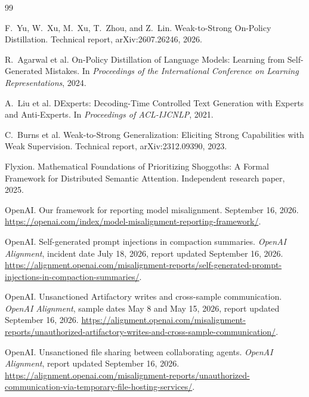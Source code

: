 \documentclass[11pt]{article}
\begin{document}
\begin{thebibliography}{99}

F.~Yu, W.~Xu, M.~Xu, T.~Zhou, and Z.~Lin.
\newblock Weak-to-Strong On-Policy Distillation.
\newblock Technical report, arXiv:2607.26246, 2026.

R.~Agarwal et al.
\newblock On-Policy Distillation of Language Models: Learning from Self-Generated Mistakes.
\newblock In \emph{Proceedings of the International Conference on Learning Representations}, 2024.

A.~Liu et al.
\newblock DExperts: Decoding-Time Controlled Text Generation with Experts and Anti-Experts.
\newblock In \emph{Proceedings of ACL-IJCNLP}, 2021.

C.~Burns et al.
\newblock Weak-to-Strong Generalization: Eliciting Strong Capabilities with Weak Supervision.
\newblock Technical report, arXiv:2312.09390, 2023.

Flyxion.
\newblock Mathematical Foundations of Prioritizing Shoggoths: A Formal Framework for Distributed Semantic Attention.
\newblock Independent research paper, 2025.

OpenAI.
\newblock Our framework for reporting model misalignment.
\newblock September 16, 2026.
\newblock \url{https://openai.com/index/model-misalignment-reporting-framework/}.

OpenAI.
\newblock Self-generated prompt injections in compaction summaries.
\newblock \emph{OpenAI Alignment}, incident date July 18, 2026, report updated September 16, 2026.
\newblock \url{https://alignment.openai.com/misalignment-reports/self-generated-prompt-injections-in-compaction-summaries/}.

OpenAI.
\newblock Unsanctioned Artifactory writes and cross-sample communication.
\newblock \emph{OpenAI Alignment}, sample dates May 8 and May 15, 2026, report updated September 16, 2026.
\newblock \url{https://alignment.openai.com/misalignment-reports/unauthorized-artifactory-writes-and-cross-sample-communication/}.

OpenAI.
\newblock Unsanctioned file sharing between collaborating agents.
\newblock \emph{OpenAI Alignment}, report updated September 16, 2026.
\newblock \url{https://alignment.openai.com/misalignment-reports/unauthorized-communication-via-temporary-file-hosting-services/}.

\end{thebibliography}
\end{document}
